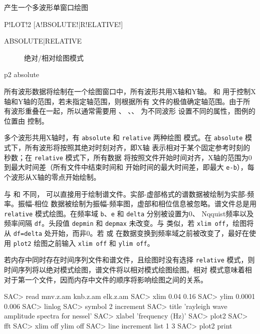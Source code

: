 \label{cmd:plot2}

产生一个多波形单窗口绘图

\begin{SACSTX}
P!LOT!2 [A!BSOLUTE!|R!ELATIVE!]
\end{SACSTX}

\begin{description}
\item [ABSOLUTE|RELATIVE] 绝对/相对绘图模式
\end{description}

\begin{SACDFT}
p2 absolute
\end{SACDFT}

所有波形数据将绘制在一个绘图窗口中，所有波形共用X轴和Y轴。
和  用于控制X轴和Y轴的范围，若未指定轴范围，则根据所有
文件的极值确定轴范围。由于所有波形重叠在一起，所以通常需要用 、
、、 为不同波形
设置不同的属性，图例的位置由  控制。

多个波形共用X轴时，有 \texttt{absolute} 和 \texttt{relative} 两种绘图
模式。在 \texttt{absolute} 模式下，所有波形将按照其绝对时刻对齐，即X轴
表示相对于某个固定参考时刻的秒数；在 \texttt{relative} 模式下，所有数据
将按照文件开始时间对齐，X轴的范围为0到最大时间差（所有文件中结束时间和
开始时间的最大时间差，即最大 \texttt{e-b}），每个波形从X轴的零点开始绘制。

与  和  不同，
可以直接用于绘制谱文件。实部-虚部格式的谱数据被绘制为实部-频率。振幅-相位
数据被绘制为振幅-频率图，虚部和相位信息被忽略。谱文件总是用 \texttt{relative}
模式绘图。在频率域 \texttt{b}、\texttt{e} 和 \texttt{delta} 分别被设置为0、
Nqquist频率以及频率间隔 \texttt{df}。头段值 \texttt{depmin} 和 \texttt{depmax}
未改变。与  类似，若 \texttt{xlim off}，绘图将从
\texttt{df=delta} 处开始，而非0。若  或 
在数据变换到频率域之前被改变了，最好在使用 \texttt{plot2} 绘图之前输入
\texttt{xlim off} 和 \texttt{ylim off}。

若内存中同时存在时间序列文件和谱文件，且绘图时没有选择 \texttt{relative}
模式，则时间序列将以绝对模式绘图，谱文件将以相对模式绘图绘图。相对
模式意味着相对于第一个文件，因而内存中文件的顺序将影响绘图之间的关系。

\begin{SACCode}
SAC> read mnv.z.am knb.z.am elk.z.am
SAC> xlim 0.04 0.16
SAC> ylim 0.0001 0.006
SAC> linlog
SAC> symbol 2 increment
SAC> title 'rayleigh wave amplitude spectra for nessel'
SAC> xlabel 'frequency (Hz)'
SAC> plot2
SAC> fft
SAC> xlim off ylim off
SAC> line increment list 1 3
SAC> plot2 print
\end{SACCode}
